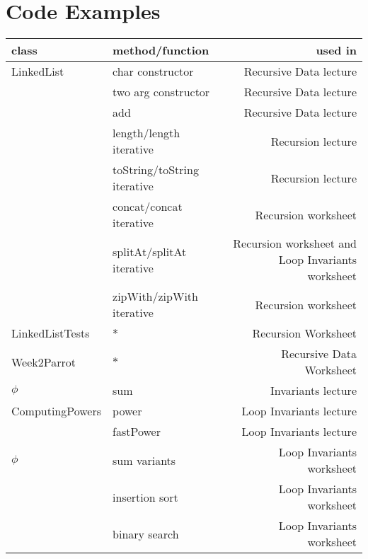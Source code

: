 \documentclass[landscape,twoside=false,DIV=14]{scrartcl}
\begin{document}
\section*{Code Examples}
\begin{tabular}{llr}
\textbf{class} & \textbf{method/function} & \textbf{used in} \\ \hline
LinkedList & char constructor & Recursive Data lecture \\
                    & two arg constructor & Recursive Data lecture\\
                    & add & Recursive Data lecture\\
                    & length/length iterative & Recursion lecture \\
                    & toString/toString iterative & Recursion lecture \\
                    & concat/concat iterative & Recursion worksheet \\
                    & splitAt/splitAt iterative & Recursion worksheet and Loop Invariants worksheet \\
                    & zipWith/zipWith iterative & Recursion worksheet \\
LinkedListTests & $*$ & Recursion Worksheet \\
Week2Parrot & $*$ & Recursive Data Worksheet\\
$\phi$ & sum & Invariants lecture \\
ComputingPowers & power & Loop Invariants lecture \\
       & fastPower & Loop Invariants lecture \\
$\phi$ & sum variants & Loop Invariants worksheet \\
       & insertion sort & Loop Invariants worksheet \\
       & binary search & Loop Invariants worksheet \\
\end{tabular}
\newpage
\end{document}
